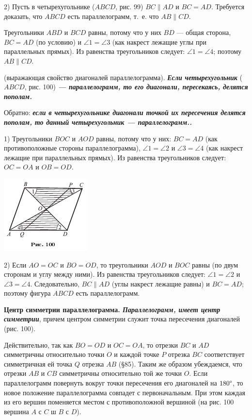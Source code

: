 \documentclass[oneside]{book}
\begin{document}
2) Пусть в четырехугольнике ($ABCD$, рис. 99) $BC\parallel AD$ и $BC = AD$.
Требуется доказать, что $ABCD$ есть параллелограмм, т.~е. что $AB \parallel CD$.

Треугольники $ABD$ и $BCD$ равны, потому что у них $BD$ — общая сторона, $BC = AD$ (по условию) и $\angle 1 = \angle 3$ (как накрест лежащие углы при параллельных прямых).
Из равенства треугольников следует:
$\angle 1 = \angle 4$;
поэтому $AB\parallel CD$.

 (выражающая свойство диагоналей параллелограмма).
\textbf{\emph{Если четырехугольник}} ($ABCD$, рис. 100) \textbf{\emph{— параллелограмм, то его диагонали, пересекаясь, делятся пополам.}}

Обратно:
\textbf{\emph{если в четырехугольнике диагонали точкой их пересечения делятся пополам, то данный четырехугольник — параллелограмм..}}

1) Треугольники $BOC$ и $AOD$ равны, потому что у них:
$BC=AD$ (как противоположные стороны параллелограмма), $\angle 1 = \angle 2$ и $\angle 3 = \angle 4$ (как накрест лежащие при параллельных прямых).
Из равенства треугольников следует:
$OC=OA$ и $OB=OD$.

\includegraphics{pics/ris-100}

2) Если $AO=OC$ и $BO=OD$, то треугольники $AOD$ и $BOC$ равны (по двум сторонам и углу между ними).
Из равенства треугольников следует:
$\angle 1 = \angle 2$ и $\angle 3 = \angle 4$.
Следовательно, $BC \parallel AD$ (углы накрест лежащие равны) и $BC=AD$;
поэтому фигура $ABCD$ есть параллелограмм.

\textbf{Центр симметрии параллелограмма.
\emph{Параллелограмм, имеет центр симметрии}}, причем центром симметрии служит точка пересечения диагоналей (рис. 100).

Действительно, так как $BO=OD$ и $OC=OA$, то отрезки $BC$ и $AD$ симметричны относительно точки $O$ и каждой точке $P$ отрезка $BC$ соответствует симметричная ей точка $Q$ отрезка $AB$ (§85).
Таким же образом убеждаемся, что отрезки $AB$ и $CB$ симметричны относительно той же точки $O$.
Если параллелограмм повернуть вокруг точки пересечения его диагоналей на $180\degree$, то новое положение параллелограмма совпадет с первоначальным.
При этом каждая из его вершин поменяется местом с противоположной вершиной (на рис. 100 вершина $A$ с $C$ ш $B$ с $D$).
\end{document}
